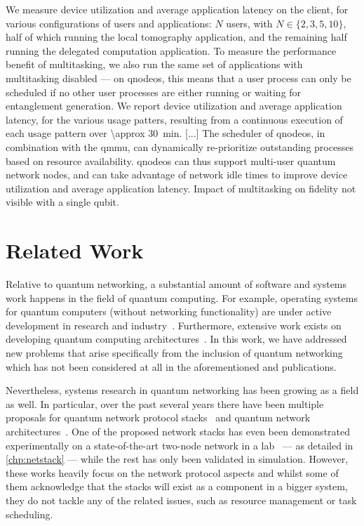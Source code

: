 We measure device utilization and average application latency on the client, for various
configurations of users and applications: $N$ users, with $N \in \{2, 3, 5, 10\}$, half of which
running the local tomography application, and the remaining half running the delegated computation
application. To measure the performance benefit of multitasking, we also run the same set of
applications with multitasking disabled --- on \acrshort{qnodeos}, this means that a user process
can only be scheduled if no other user processes are either running or waiting for entanglement
generation. We report device utilization and average application latency, for the various usage
patters, resulting from a continuous execution of each usage pattern over \qty{\approx 30}{min}.
[...] The scheduler of \acrshort{qnodeos}, in combination with the \acrshort{qmmu}, can dynamically
re-prioritize outstanding processes based on resource availability. \acrshort{qnodeos} can thus
support multi-user quantum network nodes, and can take advantage of network idle times to improve
device utilization and average application latency. Impact of multitasking on fidelity not visible
with a single qubit.

\section{Related Work}
\label{sec:qnodeos:relwork}

Relative to quantum networking, a substantial amount of software and systems work happens in the
field of quantum computing. For example, operating systems for quantum computers (without networking
functionality) are under active development in research and industry~\cite{kong_2021_origin,
deltaflow_os}. Furthermore, extensive work exists on developing quantum computing
architectures~\cite{fu_2017_microarch, murali_2019_fullstack, bourassa_2021_blueprint}. In this
work, we have addressed new problems that arise specifically from the inclusion of quantum
networking which has not been considered at all in the aforementioned  and
publications.

Nevertheless, systems research in quantum networking has been growing as a field as well. In
particular, over the past several years there have been multiple proposals for quantum network
protocol stacks~\cite{van_meter_2013_repeaters, pirker_2019_quantum, dahlberg_2019_egp,
illiano_2022_quantum} and quantum network architectures~\cite{matsuo_2019_bootstrapping,
aguado_2020_enabling, li_2022_connectionless, diadamo_2022_packet, pouryousef_2022_overlay,
gu_2023_fendi, mandil_2023_packet}. One of the proposed network stacks has even been demonstrated
experimentally on a state-of-the-art two-node network in a lab~\cite{pompili_2022_experimental} ---
as detailed in \cref{chp:netstack} --- while the rest has only been validated in simulation.
However, these works heavily focus on the network protocol aspects and whilst some of them
acknowledge that the stacks will exist as a component in a bigger system, they do not tackle any of
the related issues, such as resource management or task scheduling.

